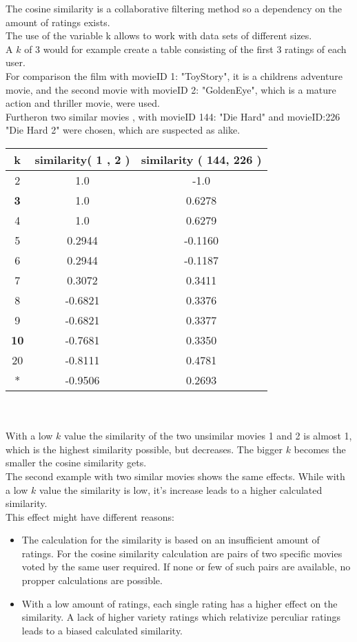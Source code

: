 \documentclass[a4paper,12pt,twoside]{article}
\begin{document}
The cosine similarity is a collaborative filtering method so a dependency on the amount of ratings exists. \\
The use of the variable k allows to work with data sets of different sizes. \\
A $k$ of 3 would for example create a table consisting of the first 3 ratings of each user. \\
For comparison the film with movieID 1: "ToyStory", it is a childrens adventure movie, and the second movie with movieID 2: "GoldenEye", which is a mature action and thriller movie, were used.\\
Furtheron two similar movies , with movieID 144: "Die Hard" and movieID:226 "Die Hard 2" were chosen, which are suspected as alike.

\begin{tabular}{c|cc}
\textbf{k} & \textbf{similarity( 1 , 2 )} & \textbf{similarity ( 144, 226  )} \\ \hline
	2 & 1.0 & -1.0 \\
	\textbf{3} & 1.0 & 0.6278 \\
	4 & 1.0 & 0.6279 \\
	5 & 0.2944 & -0.1160 \\
	6 & 0.2944 & -0.1187\\
	7 & 0.3072 & 0.3411\\
	8 & -0.6821 &  0.3376 \\
	9 & -0.6821 & 0.3377\\
	\textbf{10} & -0.7681 & 0.3350\\
	20 & -0.8111 & 0.4781 \\
	* & -0.9506 & 0.2693 \\
\end{tabular} \\
\\
With a low $k$ value the similarity of the two unsimilar movies 1 and 2 is almost 1, which is the highest similarity possible, but decreases. The bigger $k$ becomes the smaller the cosine similarity gets.\\
The second example with two similar movies shows the same effects. While with a low $k$ value the similarity is low, it's increase leads to a higher calculated similarity.\\
This effect might have different reasons:\\
\begin{itemize}
\item The calculation for the similarity is based on an insufficient amount of ratings. For the cosine similarity calculation are pairs of two specific movies voted by the same user required. If none or few of such pairs are available, no propper calculations are possible.\\
\item With a low amount of ratings, each single rating has a higher effect on the similarity. A lack of higher variety ratings which relativize perculiar ratings leads to a biased calculated similarity.
\end{itemize}
\end{document}
